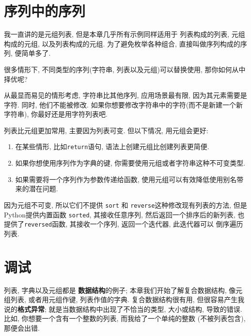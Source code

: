 \documentclass[10pt]{book}
\begin{document}
\section{序列中的序列}

我一直讲的是元组列表, 但是本章几乎所有示例同样适用于
列表构成的列表, 元组构成的元组, 以及列表构成的元组. 
为了避免枚举各种组合, 直接叫做序列构成的序列, 便简单多了. 

很多情形下, 不同类型的序列(字符串, 列表以及元组)可以替换使用, 
那你如何从中择优呢?

从最显而易见的情形考虑, 字符串比其他序列, 应用场景最有限, 
因为其元素需要是字符. 
同时, 他们不能被修改. 
如果你想要修改字符串中的字符(而不是新建一个新字符串), 
你最好还是用字符列表吧. 

列表比元组更加常用, 主要因为列表可变. 
但以下情况, 用元组会更好:

\begin{enumerate}

\item 在某些情形, 比如{\tt return}语句, 语法上创建元组比创建列表更简便. 

\item 如果你想使用序列作为字典的键, 
你需要使用元组或者字符串这种不可变类型. 

\item 如果需要将一个序列作为参数传递给函数, 
使用元组可以有效降低使用别名带来的潜在问题. 

\end{enumerate}

因为元组不可变, 所以它们不提供 {\tt sort} 和 {\tt reverse}这种修改现有列表的方法, 
但是Python提供内置函数 {\tt sorted}, 其接收任意序列, 然后返回一个排序后的新列表, 
也提供了{\tt reversed}函数, 其接收一个序列, 返回一个迭代器, 此迭代器可以
倒序遍历列表. 
 


\section{调试}

列表, 字典以及元组都是 {\bf 数据结构}的例子;
本章我们开始了解复合数据结构, 像元组列表, 或者用元组作键, 
列表作值的字典. 
复合数据结构很有用, 但很容易产生我说的{\bf 格式异常};
就是当数据结构中出现了不恰当的类型, 大小或结构, 导致的错误. 
比如, 你想要一个含有一个整数的列表, 而我给了一个单纯的整数
(不被列表包含), 那便会出错. 
\end{document}
